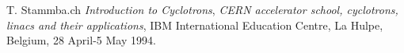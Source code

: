\begin{thebibliography}{99}

T. Stammba.ch
\emph{Introduction to Cyclotrons}, 
\emph{CERN accelerator school, cyclotrons, linacs and their applications}, 
IBM International Education Centre, La Hulpe, Belgium, 28 April-5 May 1994.

\end{thebibliography}
